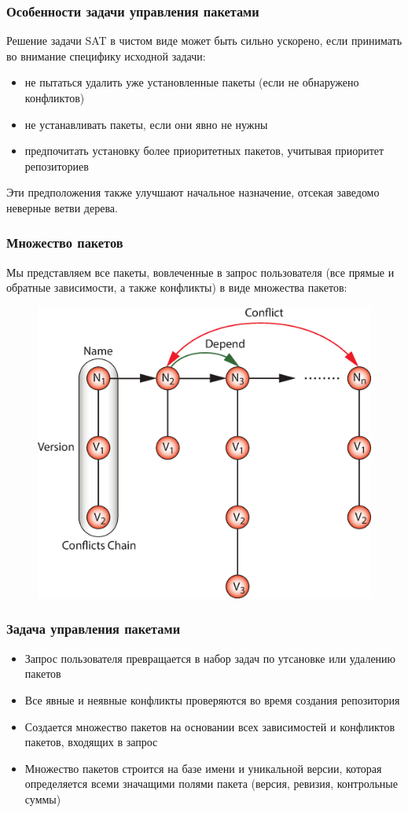 \documentclass{beamer}
\begin{document}
\begin{frame}
\frametitle{Особенности задачи управления пакетами}
Решение задачи SAT в чистом виде может быть сильно ускорено, если принимать во
внимание специфику исходной задачи:
\begin{itemize}
  \item не пытаться удалить уже установленные пакеты (если не обнаружено
  конфликтов)
  \item не устанавливать пакеты, если они явно не нужны
  \item предпочитать установку более приоритетных пакетов, учитывая приоритет
  репозиториев
\end{itemize}
Эти предположения также улучшают начальное назначение, отсекая заведомо
неверные ветви дерева.
\end{frame}

\begin{frame}
\frametitle{Множество пакетов}
Мы представляем все пакеты, вовлеченные в запрос пользователя (все прямые и
обратные зависимости, а также конфликты) в виде множества пакетов:
\begin{figure}[h!]
  \centering
  \includegraphics[height=0.7\textheight]{q5.eps}
\end{figure}
\end{frame}

\begin{frame}
\frametitle{Задача управления пакетами}
\begin{itemize}
  \item Запрос пользователя превращается в набор задач по утсановке или удалению
  пакетов
  \item Все явные и неявные конфликты проверяются во время создания репозитория
  \item Создается множество пакетов на основании всех зависимостей и конфликтов
  пакетов, входящих в запрос
  \item Множество пакетов строится на базе имени и уникальной версии, которая
  определяется всеми значащими полями пакета (версия, ревизия, контрольные
  суммы)
\end{itemize}
\end{frame}
\end{document}
